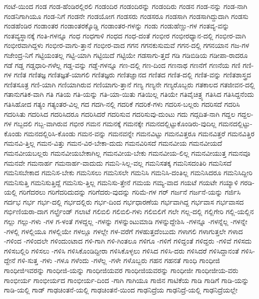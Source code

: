 {ಗಂಟೆ-ಯಿಂದ
ಗಂಡ
ಗಂಡ-ಹೆಂಡಿರಲ್ಲಿರಲಿ
ಗಂಡಂದಿರ
ಗಂಡಂದಿರನ್ನು
ಗಂಡಂದಿರು
ಗಂಡನ
ಗಂಡ-ನನ್ನು
ಗಂಡ-ನಾಗಿ
ಗಂಡನಿಗಾಗಿಯೂ
ಗಂಡ-ನಿಗೆ
ಗಂಡನೇ
ಗಂಡಯೋಗ
ಗಂಡಸರು
ಗಂಡಸರೂ
ಗಂಡಸಾಗಿ
ಗಂಡಸಾಗಿದ್ದುದಾಗಿ
ಗಂಡಸು
ಗಂಡಹೆಂಡಿರ
ಗಂಡಾಂತರ
ಗಂಡಾಂತರಕ್ಕೊಡ್ಡಿ
ಗಂಡಾಂತರ-ಗಳನ್ನು
ಗಂಡು
ಗಂಡುಹೆಣ್ಣು-ಗಳ
ಗಂತವ್ಯ-ವನ್ನು
ಗಂತವ್ಯಸ್ಥಾನಕ್ಕೆ
ಗಂತಿ-ಗಳನ್ನೂ
ಗಂಧ
ಗಂಧಗಾಳಿ
ಗಂಧದ
ಗಂಧ-ದಂತೆ
ಗಂಭೀರ
ಗಂಭೀರಧ್ಯಾನ-ದಲ್ಲಿ
ಗಂಭೀರ-ವಾಗಿ
ಗಂಭೀರವಾಗಿದ್ದಳು
ಗಂಭೀರ-ವಾಗು-ತ್ತಾನೆ
ಗಂಭೀರ-ವಾದ
ಗಗನ
ಗಗನಕುಸುಮವೆ
ಗಗನ-ದಲ್ಲಿ
ಗಗನಯಾನ
ಗಜ-ಗಳ
ಗಜೇಂದ್ರ-ನಿಗೆ
ಗಟ್ಟಿಯಂತಲ್ಲ
ಗಟ್ಟಿ-ಯಾಗಿ
ಗಟ್ಟಿಯಿದೆ
ಗಟ್ಟಿಯೇ
ಗಡಸಾಗು-ತ್ತದೆ
ಗಡಿ
ಗಡಿಬಿಡಿಯ
ಗಡೀಪಾ-ರಾದರೂ
ಗಡೆ
ಗಡ್ಡ
ಗಡ್ಡಧಾರಿ-ಗಳೆಲ್ಲ
ಗಡ್ಡ-ವನ್ನು
ಗಡ್ಡೆ-ಗಳನ್ನೂ
ಗಣ-ದಲ್ಲಿ
ಗಣ-ದಿಂದ
ಗಣನಾಥ
ಗಣನೆಗೆ
ಗಣನೆಯ
ಗಣಿ
ಗಣಿ-ಗಳ
ಗಣಿತ
ಗಣಿತಜ್ಞ
ಗಣಿತಜ್ಞತೆ-ಯಾಗಲಿ
ಗಣಿತಜ್ಞರು
ಗಣಿತಜ್ಞಾನದ
ಗಣಿತದ
ಗಣಿತ-ದಲ್ಲಿ
ಗಣಿತ-ವನ್ನು
ಗಣಿತಶಾಸ್ತ್ರದ
ಗಣಿತಸೂತ್ರ
ಗಣಿ-ಯಾಗಿ
ಗಣಿಯಾಗಿರುವ
ಗಣಿಯಾಗು-ತ್ತಾನೆ
ಗಣ್ಯ
ಗಣ್ಯನೇ
ಗಣ್ಯರೊಬ್ಬರು
ಗತಕಾಲದ
ಗತಜೀವನ-ದಲ್ಲಿ
ಗತಾನುಗತಿಕ-ವಾಗಿ
ಗತಿ
ಗತಿಯ
ಗತಿ-ಯನ್ನು
ಗತಿ-ಯಾ-ಯಿತು
ಗತಿಯಿಲ್ಲ
ಗತಿಯೇ
ಗತಿವೈಚಿತ್ರ್ಯ
ಗತಿಸಿದ
ಗತಿಸಿದ್ದನೆಂದು
ಗತಿಸಿಹೋದ
ಗತ್ಯಂ
ಗತ್ಯಂತರ-ವಿಲ್ಲ
ಗದ
ಗದಗಿ-ನಲ್ಲಿ
ಗದರಿಕೆ
ಗದರಿಕೆ-ಗಳು
ಗದರಿಸ-ಬಲ್ಲರು
ಗದರಿಸದೆ
ಗದರಿಸಿ
ಗದರಿಸಿತು
ಗದರಿಸಿದ
ಗದರಿಸಿದರೂ
ಗದರಿಸಿದರೆ
ಗದರಿಸುವ
ಗದರಿಸುವು-ದುಂಟು
ಗದು
ಗದ್ಗದಿತ-ನಾಗಿ
ಗದ್ದಲ
ಗದ್ದಲ-ಗಳ
ಗಬ್ಬದಲಿ
ಗಬ್ಬ-ವಾಗಿರುವ
ಗಭೀರ
ಗಮನ
ಗಮನಕ್ಕೆ
ಗಮನಕ್ಕೇ
ಗಮನದಲ್ಲಿಟ್ಟುಕೊಂಡಿರು-ವುದಿಲ್ಲ
ಗಮನದಲ್ಲಿಟ್ಟು-ಕೊಂಡು
ಗಮನದಲ್ಲಿರಿಸಿ-ಕೊಂಡು
ಗಮನ-ವನ್ನು
ಗಮನವನ್ನೇ
ಗಮನವಿಟ್ಟು
ಗಮನವಿತ್ತರೂ
ಗಮನವಿತ್ತರೆ
ಗಮನವಿತ್ತಿರ
ಗಮನವಿ-ತ್ತಿಲ್ಲ
ಗಮನ-ವಿತ್ತು
ಗಮನ-ವಿರ-ಬೇಕಾ-ದುದು
ಗಮನವಿರಿಸದೆ
ಗಮನವೀಯ
ಗಮನವೀಯದೆ
ಗಮನವೀಯಬಲ್ಲರು
ಗಮನವೀಯಬೇಕಾಗಿಲ್ಲ
ಗಮನವೀಯ-ಬೇಕು
ಗಮನವೀಯ-ಲಿಲ್ಲ
ಗಮನವೀಯುತ್ತ
ಗಮನವೂ
ಗಮನವೇ
ಗಮನಾರ್ಹ
ಗಮನಾರ್ಹ-ವಾದುದು
ಗಮನಿ-ಸಿಲ್ಲ-ವಲ್ಲ
ಗಮನಿಸತಕ್ಕ
ಗಮನಿಸದಂತಿರಿ
ಗಮನಿಸದೆ
ಗಮನಿಸಬೇಕಾದ
ಗಮನಿಸ-ಬೇಕು
ಗಮನಿಸಲು
ಗಮನಿಸಲೇ
ಗಮನಿಸಿ
ಗಮನಿಸಿ-ದಂತಿಲ್ಲ
ಗಮನಿಸಿದರೂ
ಗಮನಿಸಿದ್ದೀರಿ
ಗಮನಿಸುತ್ತಿ
ಗಮನಿಸುತ್ತಿದ್ದೆ
ಗಮನಿಸು-ತ್ತಿಲ್ಲ
ಗಮನಿಸು-ತ್ತೇನೆ
ಗಮಯ
ಗಮ್ಯ-ವಾದ
ಗಯಟೆ
ಗಯಟೇ
ಗಯ್ಯಾಳಿ
ಗರಡಿ-ಯಲ್ಲಿ
ಗರಿಗೆದರಲು
ಗರಿಗೆದರಿದುದನ್ನು
ಗರಿಗೆದರು-ವುದನ್ನು
ಗರಿಮೆ-ಗಳ
ಗರ್
ಗರ್ಜನೆ
ಗರ್ಜನೆ-ಯನ್ನು
ಗರ್ಜಿಸಿ
ಗರ್ದಭ
ಗರ್ಭ
ಗರ್ಭ-ದಲ್ಲಿ
ಗರ್ಭದಲ್ಲಿರು
ಗರ್ಭ-ದಿಂದ
ಗರ್ಭಧಾರಣೆಯ
ಗರ್ಭವಾಗಿದ್ದ
ಗರ್ಭವಾಸ
ಗರ್ಭವಾಸದ
ಗರ್ಭಿಣಿಯರಾ-ದಾಗ
ಗರ್ಲ್ಫ್ರೆಂಡ್
ಗಲಾಟೆ
ಗಲಿಬಿಲಿ
ಗಲಿಬಿಲಿ-ಗಳು
ಗಲಿಬಿಲಿಗೆ
ಗಲೇ
ಗಲ್ಲ-ದಲ್ಲಿ
ಗಲ್ಲಿಗೇರಿ
ಗಲ್ಲಿ-ಯಲ್ಲಿನ
ಗಲ್ಲು
ಗಲ್ಲು-ಗಳು
-ಗಳ
ಗ-ಳಂತೆ
ಗಳದ್ದಲ್ಲ
-ಗಳನ್ನು
ಗಳನ್ನುಂಟುಮಾಡಿ
ಗಳನ್ನುದ್ದೇಶಿಸಿ
-ಗಳನ್ನೂ
-ಗಳನ್ನೆಲ್ಲ
-ಗಳನ್ನೇ
-ಗಳಲ್ಲಿ
ಗಳಲ್ಲಿಯೂ
ಗಳಲ್ಲಿಯೇ
ಗಳಲ್ಲೂ
ಗಳಲ್ಲೇ
ಗಳ-ವರೆಗೆ
ಗಳಹುತ್ತದೆಂಬುದು
ಗಳಾಗಲಿ
ಗಳಾಗುತ್ತಲೇ
ಗಳಾದ
-ಗಳಿಂದ
-ಗಳಿಂದಲೇ
ಗಳಿಂದುಂಟಾದ
ಗಳಿ-ಗಾಗಿ
ಗಳಿ-ಗಿಂತಲೂ
ಗಳಿಗೂ
-ಗಳಿಗೆ
ಗಳಿದ್ದಂತೆ
ಗಳಿದ್ದರು
-ಗಳಿವೆ
ಗಳಿಸದು
ಗಳಿಸಬಲ್ಲಿರಿ
ಗಳಿಸಲು
-ಗಳಿಸಿ
ಗಳಿಸಿಕೊಂಡಿದ್ದೀರಾ
ಗಳಿಸಿಕೊಳ್ಳಲು
ಗಳಿಸಿದ
ಗಳಿಸಿ-ದರು
ಗಳಿಸಿದರೆ
ಗಳಿಸಿದ್ದಾನಂತೆ
ಗಳಿಸಿ-ದ್ದೇನೆ
ಗಳಿ-ಸುತ್ತ
-ಗಳು
-ಗಳೂ
ಗಳೆಂದು
-ಗಳೆಲ್ಲ
-ಗಳೇ
ಗಳೊಬ್ಬರು
ಗಹನ
ಗಹನತೆ
ಗಾಂಧಿ
ಗಾಂಧೀಜಿ
ಗಾಂಧೀಜಿಇವರನ್ನು
ಗಾಂಧೀಜಿ-ಯನ್ನು
ಗಾಂಧೀಜಿಯವರ
ಗಾಂಧೀಜಿಯವರನ್ನು
ಗಾಂಧೀಜೀ
ಗಾಂಧೀಜೀಯ-ವರು
ಗಾಂಭೀರ್ಯ
ಗಾಂಭೀರ್ಯದ
ಗಾಂಭೀರ್ಯ-ದಿಂದ
-ಗಾಗಿ
ಗಾಗಿಯೂ
ಗಾಜಿನ
ಗಾಟಿಕೆಯ
ಗಾಡಿ
ಗಾಡಿಗೆ
ಗಾಡಿ-ಯನ್ನು
ಗಾಡಿ-ಯಲ್ಲಿ
ಗಾಡ್
ಗಾಢಚಿಂತನೆ-ಯಲ್ಲಿ
ಗಾಢಚಿಂತನೆ-ಯಿಂದ
ಗಾಢನಿದ್ರೆಯ
ಗಾಢನಿದ್ರೆ-ಯಲ್ಲಿ
ಗಾಢನಿದ್ರೆಯಲ್ಲೇ
}
